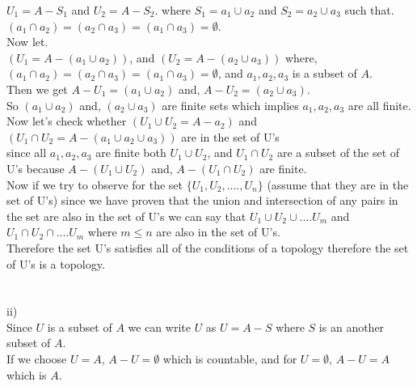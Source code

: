 \documentclass[11pt]{article}
\begin{document}
$U_1 = A - S_1$ and $U_2 = A - S_2$. where $S_1 = a_1 \cup a_2$ and $S_2 = a_2 \cup a_3$ such that.\\

$(a_1 \cap a_2) = (a_2 \cap a_3) = (a_1 \cap a_3) = \emptyset$.\\

Now let.\\

$(U_1 = A - (a_1 \cup a_2))$, and $(U_2 = A - (a_2 \cup a_3))$ where,\\

$(a_1 \cap a_2) = (a_2 \cap a_3) = (a_1 \cap a_3) = \emptyset$, and $a_1, a_2, a_3$ is a subset of $A$.\\

Then we get $A - U_1 = (a_1\cup a_2)$ and, $A-U_2 = (a_2 \cup a_3)$.\\

So $(a_1 \cup a_2)$ and, $(a_2 \cup a_3)$ are finite sets which implies $a_1, a_2, a_3$ are all finite.\\

Now let's check whether $(U_1 \cup U_2 = A - a_2)$ and $(U_1 \cap U_2 = A - (a_1 \cup a_2 \cup a_3))$ are in the set of U's\\

since all $a_1, a_2, a_3$ are finite both $U_1 \cup U_2$, and $U_1 \cap U_2$ are a subset of the set of U's because $A - (U_1 \cup U_2)$ and, $A - (U_1 \cap U_2)$ are finite.\\

Now if we try to observe for the set $\{U_1, U_2, ...., U_n\}$ (assume that they are in the set of U's) since we have proven that the union and intersection of any pairs in the set are also in the set of U's we can say that $U_1 \cup U_2 \cup .... U_m$ and $U_1 \cap U_2 \cap .... U_m$ where $m \le n$ are also in the set of U's.\\

Therefore the set U's satisfies all of the conditions of a topology therefore the set of U's is a topology.\\\\\\

ii)\\

Since $U$ is a subset of $A$ we can write $U$ as $U = A - S$ where $S$ is an another subset of $A$.\\

If we choose $U = A$, $A-U = \emptyset$ which is countable, and for $U = \emptyset$, $A-U = A$ which is $A$.\\
\end{document}
